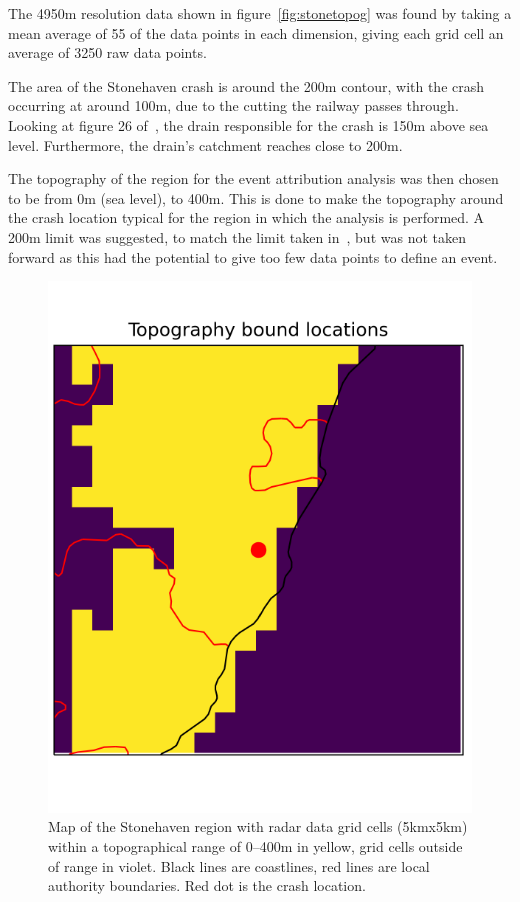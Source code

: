 \documentclass[12pt,a4paper]{report}
\begin{document}
The 4950m resolution data shown in figure~\ref{fig:stonetopog} was found by taking a mean average of 55 of the data points in each dimension,
    giving each grid cell an average of 3250 raw data points.

The area of the Stonehaven crash is around the 200m contour,
    with the crash occurring at around 100m,
    due to the cutting the railway passes through.
Looking at figure 26 of~\cite{RAIB_2022},
    the drain responsible for the crash is 150m above sea level.
Furthermore, the drain's catchment reaches close to 200m.

The topography of the region for the event attribution analysis was then chosen to be from 0m (sea level),
    to 400m.
This is done to make the topography around the crash location typical for the region in which the analysis is performed.
A 200m limit was suggested,
    to match the limit taken in~\cite{Tett_Soon},
    but was not taken forward as this had the potential to give too few data points to define an event.

\begin{figure}[H]
    \begin{center}
        \includegraphics{stonetopogcut}
    \end{center}
    \caption{Map of the Stonehaven region with radar data grid cells (5kmx5km) within a topographical range of 0--400m in yellow,
    grid cells outside of range in violet.
    Black lines are coastlines, red lines are local authority boundaries.
    Red dot is the crash location.}
    \label{fig:stonetopogallowed}
\end{figure}
\end{document}
